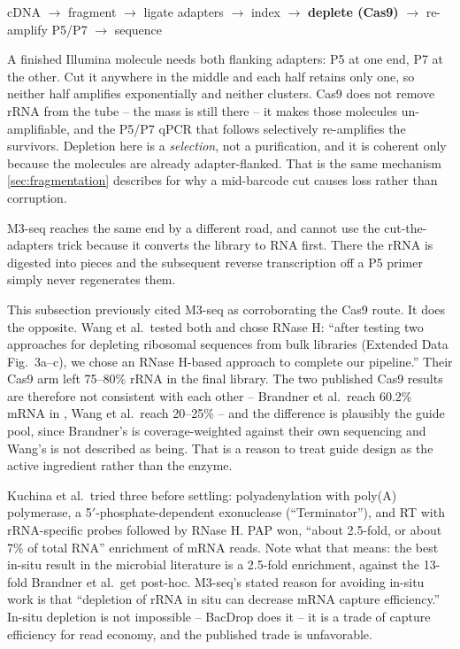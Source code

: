 \begin{center}\footnotesize
cDNA $\rightarrow$ fragment $\rightarrow$ ligate adapters $\rightarrow$ index
$\rightarrow$ \textbf{deplete (Cas9)} $\rightarrow$ re-amplify P5/P7
$\rightarrow$ sequence
\end{center}

 A finished Illumina molecule needs
both flanking adapters: P5 at one end, P7 at the other. Cut it anywhere in the
middle and each half retains only one, so neither half amplifies exponentially
and neither clusters. Cas9 does not remove rRNA from the tube -- the mass is
still there -- it makes those molecules un-amplifiable, and the P5/P7 qPCR that
follows selectively re-amplifies the survivors. Depletion here is a
\emph{selection}, not a purification, and it is coherent only because the
molecules are already adapter-flanked. That is the same mechanism
\cref{sec:fragmentation} describes for why a mid-barcode cut causes loss rather
than corruption.

M3-seq reaches the same end by a different road, and cannot use the
cut-the-adapters trick because it converts the library to RNA first. There the
rRNA is digested into pieces and the subsequent reverse transcription off a P5
primer simply never regenerates them.

 This
subsection previously cited M3-seq as corroborating the Cas9 route. It does the
opposite. Wang et al.\ tested both and chose RNase H: ``after testing two
approaches for depleting ribosomal sequences from bulk libraries (Extended Data
Fig.~3a--c), we chose an RNase H-based approach to complete our pipeline.'' Their
Cas9 arm left 75--80\% rRNA in the final library. The two published Cas9 results
are therefore not consistent with each other -- Brandner et al.\ reach 60.2\%
mRNA in , Wang et al.\ reach 20--25\% -- and the difference is
plausibly the guide pool, since Brandner's is coverage-weighted against their own
sequencing and Wang's is not described as being. That is a reason to treat guide
design as the active ingredient rather than the enzyme.

 Kuchina
et al.\ tried three before settling: polyadenylation with  poly(A)
polymerase, a 5$'$-phosphate-dependent exonuclease (``Terminator''), and RT with
rRNA-specific probes followed by RNase H. PAP won, ``about 2.5-fold, or about
7\% of total RNA'' enrichment of mRNA reads. Note what that means: the best
in-situ result in the microbial literature is a 2.5-fold enrichment, against the
13-fold Brandner et al.\ get post-hoc. M3-seq's stated reason for avoiding
in-situ work is that ``depletion of rRNA in situ can decrease mRNA capture
efficiency.'' In-situ depletion is not impossible -- BacDrop does it -- it is a
trade of capture efficiency for read economy, and the published trade is
unfavorable.

